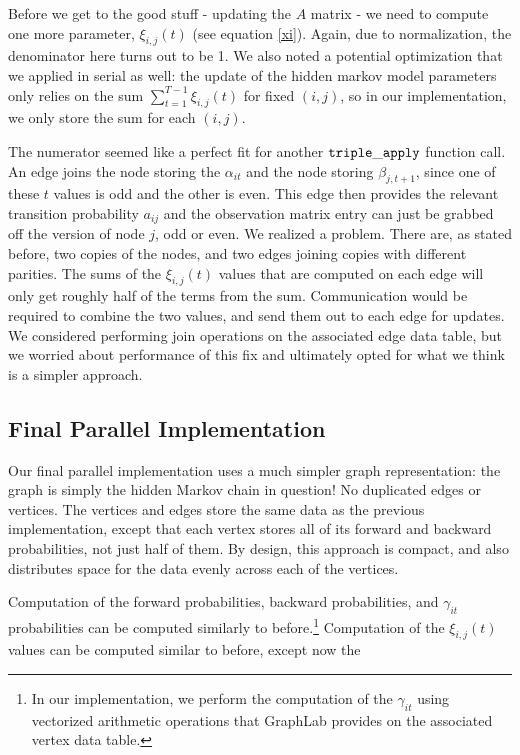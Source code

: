 Before we get to the good stuff - updating the $A$ matrix - we need to compute
one more parameter, $\xi_{i,j}(t)$ (see equation \ref{xi}).
Again, due to normalization, the denominator here turns out to be 1.  We also
noted a potential optimization that we applied in serial as well: the update of
the hidden markov model parameters only relies on the sum $\sum_{t = 1}^{T-1}
\xi_{i,j}(t) $ for fixed $(i, j)$, so in our implementation, we only store the sum for each $(i, j)$.

The numerator seemed like a perfect fit for another $\tt{triple\_apply}$
function call.  An edge joins the node storing the $\alpha_{it}$ and the node
storing $\beta_{j, t+1}$, since one of these $t$ values is odd and the other is
even.  This edge then provides the relevant transition probability $a_{ij}$ and
the observation matrix entry can just be grabbed off the version of node $j$,
odd or even.  We realized a problem. There are, as stated before, two copies of
the nodes, and two edges joining copies with different parities.  The sums of
the $\xi_{i,j}(t)$ values that are computed on each edge will only get roughly half of the terms from the sum.  Communication would be required to combine the two values, and send them out to each edge for updates.  We considered performing join operations on the associated edge data table, but we worried about performance of this fix and ultimately opted for what we think is a simpler approach.

\subsection{Final Parallel Implementation}

Our final parallel implementation uses a much simpler graph representation: the graph is simply the hidden Markov chain in question! No duplicated edges or vertices.  The vertices and edges store the same data as the previous implementation, except that each vertex stores all of its forward and backward probabilities, not just half of them.  By design, this approach is compact, and also distributes space for the data evenly across each of the vertices.

Computation of the forward probabilities, backward probabilities, and
$\gamma_{it}$ probabilities can be computed similarly to before.\footnote{In our
    implementation, we perform the computation of the $\gamma_{it}$ using
vectorized arithmetic operations that GraphLab provides on the associated vertex
data table.}  Computation of the $\xi_{i, j}(t)$ values can be computed similar to before, except now the 


